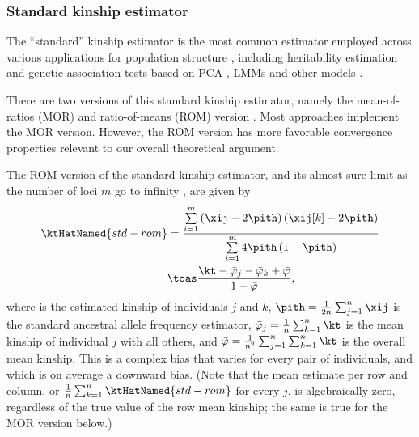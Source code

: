 \documentclass[11pt]{article}
\begin{document}
\subsubsection{Standard kinship estimator}

The ``standard'' kinship estimator is the most common estimator employed across various applications for population structure \citep{astle_population_2009, yang_advantages_2014, speed_relatedness_2015, wang_efficient_2017}, including
heritability estimation \citep{speed_improved_2012, yang_advantages_2014, speed_relatedness_2015, speed_reevaluation_2017}
and genetic association tests based on PCA \citep{price_principal_2006},
LMMs \citep{astle_population_2009, zhou_genome-wide_2012, yang_advantages_2014, loh_efficient_2015, sul_population_2018}
and other models \citep{rakovski_kinship-based_2009, thornton_roadtrips:_2010}.

There are two versions of this standard kinship estimator, namely the mean-of-ratios (MOR) and ratio-of-means (ROM) version \citep{ochoa_estimating_2021}.
Most approaches implement the MOR version.
However, the ROM version has more favorable convergence properties relevant to our overall theoretical argument.

The ROM version of the standard kinship estimator, and its almost sure limit as the number of loci $m$ go to infinity \citep{ochoa_estimating_2021}, are given by
\begin{align}
  \label{eq:kinship_std_rom}
  \ktHatNamed{std-rom}
  &=
    \frac{
    \sum\limits_{i=1}^m \left( \xij - 2 \pith \right) \left( \xij[k] - 2 \pith \right)
    }{
    \sum\limits_{i=1}^m 4 \pith \left( 1-\pith \right)
    }
  \\
  \label{eq:kinship_std_lim}
  &\toas
    \frac{\kt -\bar{\varphi}_j -\bar{\varphi}_k + \bar{\varphi}}{1 - \bar{\varphi}}
    ,
\end{align}
where  is the estimated kinship of individuals $j$ and $k$,
$\pith = \frac{1}{2n} \sum_{j=1}^n \xij$ is the standard ancestral allele frequency estimator,
$\bar{\varphi}_j = \frac{1}{n} \sum_{k=1}^n \kt$ is the mean kinship of individual $j$ with all others, and
$\bar{\varphi} = \frac{1}{n^2} \sum_{j=1}^n \sum_{k=1}^n \kt$ is the overall mean kinship.
This is a complex bias that varies for every pair of individuals, and which is on average a downward bias.
(Note that the mean estimate per row and column, or $\frac{1}{n} \sum_{k=1}^n \ktHatNamed{std-rom}$ for every $j$, is algebraically zero, regardless of the true value of the row mean kinship; the same is true for the MOR version below.)
\end{document}
